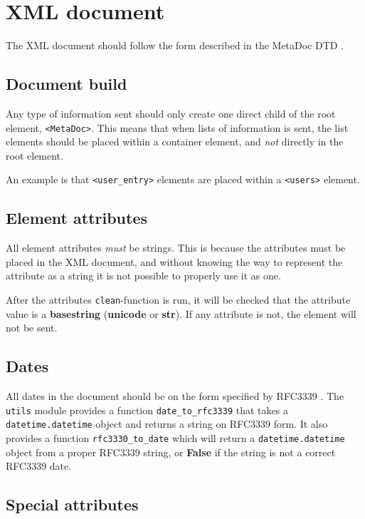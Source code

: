 \documentclass[titlepage, a4paper,10pt]{article}
\begin{document}
\newpage
\section{XML document}
\label{sec:xmldoc}

The XML document should follow the form described in the MetaDoc DTD 
\cite{metadoc_dtd}. 

\subsection{Document build}

Any type of information sent should only create one direct child of the root
element, \texttt{<MetaDoc>}. This means that when lists of information is sent, 
the list elements should be placed within a container element, and \textit{not} 
directly in the root element.

An example is that \texttt{<user\_entry>} elements are placed within a
\texttt{<users>} element. 

\subsection{Element attributes}

All element attributes \textit{must} be strings. This is because the attributes 
must be placed in the XML document, and without knowing the way to represent the 
attribute as a string it is not possible to properly use it as one.

After the attributes \texttt{clean}-function is run, it will be checked that
the attribute value is a \textbf{basestring} (\textbf{unicode} or
\textbf{str}). If any attribute is not, the element will not be sent. 

\subsection{Dates}

All dates in the document should be on the form specified by RFC3339 
\cite{rfc3339}. The \texttt{utils} module provides a function 
\texttt{date\_to\_rfc3339} that takes a \texttt{datetime.datetime} object and 
returns a string on RFC3339 form. It also provides a function
\texttt{rfc3330\_to\_date} which will return a \texttt{datetime.datetime}
object from a proper RFC3339 string, or \textbf{False} if the string is not a
correct RFC3339 date.

\subsection{Special attributes}
\end{document}

